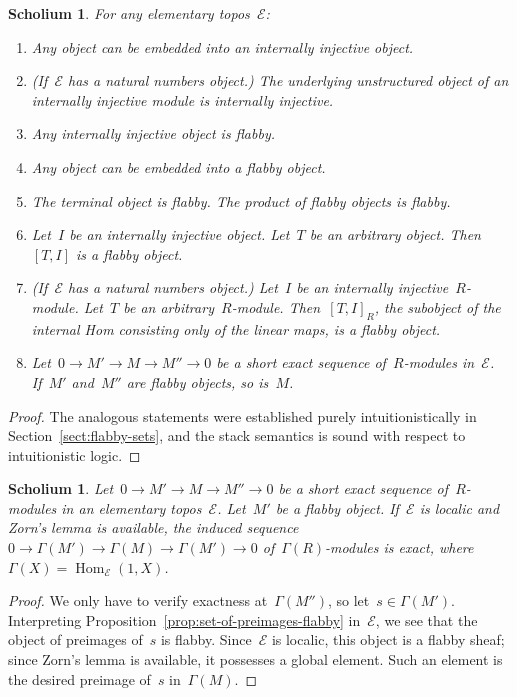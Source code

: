 \documentclass[oneside]{amsart}
\theoremstyle{definition}
\theoremstyle{plain}
\newtheorem{scholium}[defn]{Scholium}
\theoremstyle{remark}
\newcommand{\E}{\mathcal{E}}
\DeclareMathOperator{\Hom}{Hom}
\renewcommand{\_}{\mathpunct{.}\,}
\begin{document}
\begin{scholium}\label{scholium:properties-of-flabby-objects}
For any elementary topos~$\E$:
\begin{enumerate}
\item Any object can be embedded into an internally injective object.
\item (If~$\E$ has a natural numbers object.) The underlying unstructured
object of an internally injective module is internally injective.
\item Any internally injective object is flabby.
\item Any object can be embedded into a flabby object.
\item The terminal object is flabby. The product of flabby objects is flabby.
\item Let~$I$ be an internally injective object. Let~$T$ be an arbitrary
object. Then~$[T,I]$ is a flabby object.
\item (If~$\E$ has a natural numbers object.) Let~$I$ be an internally
injective~$R$-module. Let~$T$ be an arbitrary~$R$-module. Then~$[T,I]_R$, the
subobject of the internal Hom consisting only of the linear maps, is a flabby
object.
\item Let~$0 \to M' \to M \to M'' \to 0$ be a short exact sequence
of~$R$-modules in~$\E$. If~$M'$ and~$M''$ are flabby objects, so is~$M$.
\end{enumerate}
\end{scholium}

\begin{proof}The analogous statements were established purely
intuitionistically in Section~\ref{sect:flabby-sets}, and the stack semantics
is sound with respect to intuitionistic logic.
\end{proof}

\begin{scholium}\label{scholium:exact-as-presheaves}
Let~$0 \to M' \to M \to M'' \to 0$ be a short exact sequence
of~$R$-modules in an elementary topos~$\E$. Let~$M'$ be a flabby object.
If~$\E$ is localic and Zorn's lemma is available, the induced sequence~$0 \to
\Gamma(M') \to \Gamma(M) \to \Gamma(M') \to 0$ of~$\Gamma(R)$-modules is exact,
where~$\Gamma(X) = \Hom_\E(1,X)$.\end{scholium}

\begin{proof}We only have to verify exactness at~$\Gamma(M'')$, so let~$s \in
\Gamma(M')$. Interpreting Proposition~\ref{prop:set-of-preimages-flabby}
in~$\E$, we see that the object of preimages of~$s$ is flabby. Since~$\E$ is
localic, this object is a flabby sheaf; since Zorn's lemma is available, it
possesses a global element. Such an element is the desired preimage of~$s$
in~$\Gamma(M)$.\end{proof}
\end{document}
